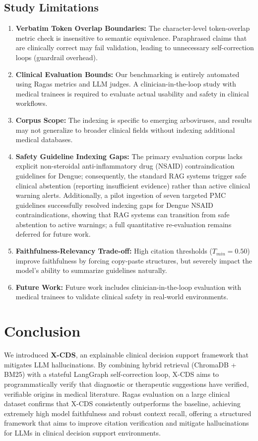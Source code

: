 \documentclass[sn-mathphys,Numbered]{sn-jnl}%
\begin{document}
\subsection{Study Limitations}
\begin{enumerate}
    \item \textbf{Verbatim Token Overlap Boundaries:} The character-level token-overlap metric check is insensitive to semantic equivalence. Paraphrased claims that are clinically correct may fail validation, leading to unnecessary self-correction loops (guardrail overhead).
    \item \textbf{Clinical Evaluation Bounds:} Our benchmarking is entirely automated using Ragas metrics and LLM judges. A clinician-in-the-loop study with medical trainees is required to evaluate actual usability and safety in clinical workflows.
    \item \textbf{Corpus Scope:} The indexing is specific to emerging arboviruses, and results may not generalize to broader clinical fields without indexing additional medical databases.
    \item \textbf{Safety Guideline Indexing Gaps:} The primary evaluation corpus lacks explicit non-steroidal anti-inflammatory drug (NSAID) contraindication guidelines for Dengue; consequently, the standard RAG systems trigger safe clinical abstention (reporting insufficient evidence) rather than active clinical warning alerts. Additionally, a pilot ingestion of seven targeted PMC guidelines successfully resolved indexing gaps for Dengue NSAID contraindications, showing that RAG systems can transition from safe abstention to active warnings; a full quantitative re-evaluation remains deferred for future work.
    \item \textbf{Faithfulness-Relevancy Trade-off:} High citation thresholds ($T_{min} = 0.50$) improve faithfulness by forcing copy-paste structures, but severely impact the model's ability to summarize guidelines naturally. 
    \item \textbf{Future Work:} Future work includes clinician-in-the-loop evaluation with medical trainees to validate clinical safety in real-world environments.
\end{enumerate}

\section{Conclusion}\label{sec6}
We introduced \textbf{X-CDS}, an explainable clinical decision support framework that mitigates LLM hallucinations. By combining hybrid retrieval (ChromaDB + BM25) with a stateful LangGraph self-correction loop, X-CDS aims to programmatically verify that diagnostic or therapeutic suggestions have verified, verifiable origins in medical literature. Ragas evaluation on a large clinical dataset confirms that X-CDS consistently outperforms the baseline, achieving extremely high model faithfulness and robust context recall, offering a structured framework that aims to improve citation verification and mitigate hallucinations for LLMs in clinical decision support environments.
\end{document}
